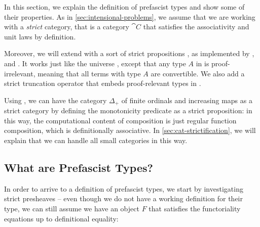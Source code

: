 In this section, we explain the definition of prefascist types and show some of 
their properties.
% 
As in \cref{sec:intensional-problems}, we assume that we are working with a 
\emph{strict} category, that is a category \( \cat{C} \) that satisfies the 
associativity and unit laws by definition. 

Moreover, we will extend \MLTT with a sort of strict propositions ,
as implemented by \Coq, \Agda and \Lean {}.
% 
It works just like the universe , except that any type \( A \) 
in  is proof-irrelevant, meaning that all terms with type 
\( A \) are convertible.
% 
We also add a strict truncation operator  that embeds 
proof-relevant types in .

Using , we can have the category \( \Delta_+ \) of finite ordinals 
and increasing maps as a strict category by defining the monotonicity predicate 
as a strict proposition: 
% 
in this way, the computational content of composition is just regular function 
composition, which is definitionally associative.
% 
In \cref{sec:cat-strictification}, we will explain that we can handle all small
categories in this way.

\subsection{What are Prefascist Types?}

In order to arrive to a definition of prefascist types, we start by 
investigating strict presheaves -- even though we do not have a working 
definition for their type, we can still assume we have an object \( F \)
that satisfies the functoriality equations up to definitional equality:


